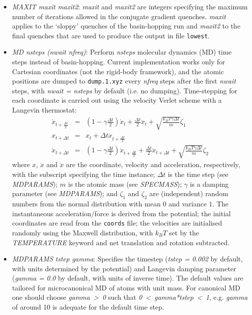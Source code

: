 \documentclass[12pt,a4paper,dvips]{article}
\begin{document}
\begin{itemize}
\item {\it MAXIT maxit maxit2\/}: {\it maxit\/} and {\it maxit2\/} are integers specifying the
maximum number of iterations allowed in the conjugate gradient quenches. {\it maxit\/} applies
to the `sloppy' quenches of the basin-hopping run and {\it maxit2\/} to the final quenches
that are used to produce the output in file {\tt lowest}.

\item {\it MD nsteps (nwait nfreq)\/}: Perform {\it nsteps} molecular dynamics (MD) time steps instead of basin-hopping. Current implementation works only for Cartesian coordinates (not the rigid-body framework), and the atomic positions are dumped to {\tt dump.1.xyz} every {\it nfreq} steps after the first {\it nwait} steps, with {\it nwait = nsteps} by default (i.e. no dumping). Time-stepping for each coordinate is carried out using the velocity Verlet scheme with a Langevin thermostat:
\begin{eqnarray*}
\dot{x}_{t+\frac{\Delta t}{2}}  & = & (1-\gamma \frac{\Delta t}{2}) \dot{x}_{t} + \frac{\Delta t}{2} \ddot{x}_{t} + \sqrt{\frac{k_{B}T \gamma \Delta t}{m}}\zeta_{1} \\
x_{t+\Delta t} & = & x_{t} + \Delta t \dot{x}_{t+\frac{\Delta t}{2}} \\
\dot{x}_{t+\Delta t}  & = & (1-\gamma \frac{\Delta t}{2}) \dot{x}_{t+\frac{\Delta t}{2}} + \frac{\Delta t}{2} \ddot{x}_{t+\Delta t} + \sqrt{\frac{k_{B}T \gamma \Delta t}{m}}\zeta_{2}
\end{eqnarray*}
where $x$, $\dot{x}$ and $\ddot{x}$ are the coordinate, velocity and acceleration, respectively, with the subscript specifying the time instance; $\Delta t$ is the time step (see \emph{MDPARAMS}); $m$ is the atomic mass (see \emph{SPECMASS}); $\gamma$ is a damping parameter (see \emph{MDPARAMS}); and $\zeta_{1}$ and $\zeta_{2}$ are (independent) random numbers from the normal distribution with mean $0$ and variance $1$. The instantaneous acceleration/force is derived from the potential; the initial coordinates are read from the {\tt coords} file; the velocities are initialised randomly using the Maxwell distribution, with $k_{B}T$ set by the \emph{TEMPERATURE} keyword and net translation and rotation subtracted.
 
\item {\it MDPARAMS tstep gamma\/}: Specifies the timestep (\emph{tstep  = 0.002} by default, with units determined by the potential) and Langevin damping parameter (\emph{gamma = 0.0} by default, with units of inverse time). The default values are tailored for microcanonical MD of atoms with unit mass. For canonical MD one should choose \emph{gamma~\textgreater~0} such that \emph{0~\textless~gamma*tstep~\textless~1}, e.g. \emph{gamma} of around 10 is adequate for the default time step.


\end{itemize}
\end{document}

